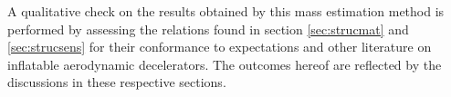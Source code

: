 A qualitative check on the results obtained by this mass estimation method is performed by assessing the relations found in section \ref{sec:strucmat} and \ref{sec:strucsens} for their conformance to expectations and other literature on inflatable aerodynamic decelerators. The outcomes hereof are reflected by the discussions in these respective sections.



